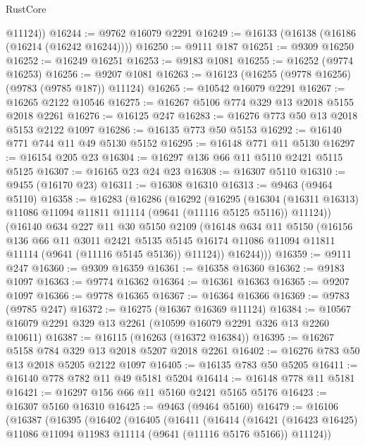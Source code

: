 \begin{lexlean}{RustCore}
\begin{coremodule}
        @11124))
@16244 := @9762 @16079 @2291
@16249 := @16133 (@16138 (@16186 (@16214 (@16242 @16244))))
@16250 := @9111 @187
@16251 := @9309 @16250
@16252 := @16249 @16251
@16253 := @9183 @1081
@16255 := @16252 (@9774 @16253)
@16256 := @9207 @1081
@16263 := @16123 (@16255 (@9778 @16256) (@9783 (@9785 @187)) @11124)
@16265 := @10542 @16079 @2291
@16267 := @16265 @2122 @10546
@16275 := @16267 @5106 @774 @329 @13 @2018 @5155 @2018 @2261
@16276 := @16125 @247
@16283 := @16276 @773 @50 @13 @2018 @5153 @2122 @1097
@16286 := @16135 @773 @50 @5153
@16292 := @16140 @771 @744 @11 @49 @5130 @5152
@16295 := @16148 @771 @11 @5130
@16297 := @16154 @205 @23
@16304 := @16297 @136 @66 @11 @5110 @2421 @5115 @5125
@16307 := @16165 @23 @24 @23
@16308 := @16307 @5110
@16310 := @9455 (@16170 @23)
@16311 := @16308 @16310
@16313 := @9463 (@9464 @5110)
@16358 := @16283
    (@16286
      (@16292
        (@16295
          (@16304 (@16311 @16313) @11086 @11094 @11811 @11114 (@9641 (@11116 @5125 @5116)) @11124))
        (@16140
          @634
          @227
          @11
          @30
          @5150
          @2109
          (@16148
            @634
            @11
            @5150
            (@16156
              @136
              @66
              @11
              @3011
              @2421
              @5135
              @5145
              @16174
              @11086
              @11094
              @11811
              @11114
              (@9641 (@11116 @5145 @5136))
              @11124))
          @16244)))
@16359 := @9111 @247
@16360 := @9309 @16359
@16361 := @16358 @16360
@16362 := @9183 @1097
@16363 := @9774 @16362
@16364 := @16361 @16363
@16365 := @9207 @1097
@16366 := @9778 @16365
@16367 := @16364 @16366
@16369 := @9783 (@9785 @247)
@16372 := @16275 (@16367 @16369 @11124)
@16384 := @10567 @16079 @2291 @329 @13 @2261 (@10599 @16079 @2291 @326 @13 @2260 @10611)
@16387 := @16115 (@16263 (@16372 @16384))
@16395 := @16267 @5158 @784 @329 @13 @2018 @5207 @2018 @2261
@16402 := @16276 @783 @50 @13 @2018 @5205 @2122 @1097
@16405 := @16135 @783 @50 @5205
@16411 := @16140 @778 @782 @11 @49 @5181 @5204
@16414 := @16148 @778 @11 @5181
@16421 := @16297 @156 @66 @11 @5160 @2421 @5165 @5176
@16423 := @16307 @5160 @16310
@16425 := @9463 (@9464 @5160)
@16479 := @16106
    (@16387
      (@16395
        (@16402
          (@16405
            (@16411
              (@16414
                (@16421
                  (@16423 @16425)
                  @11086
                  @11094
                  @11983
                  @11114
                  (@9641 (@11116 @5176 @5166))
                  @11124))

\end{coremodule}
\end{lexlean}
